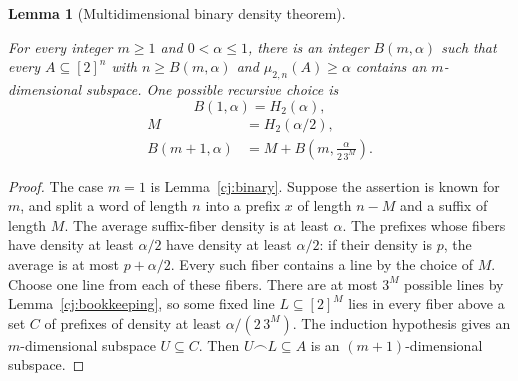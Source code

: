 \documentclass[11pt]{amsart}
\newtheorem{lemma}[theorem]{Lemma}
\theoremstyle{definition}
\theoremstyle{remark}
\numberwithin{equation}{section}
\providecommand{\lean}[1]{}
\providecommand{\leanok}{}
\begin{document}
\begin{lemma}[Multidimensional binary density theorem]\label{cj:binary-multi}
\lean{Auto.C_cj_binary_multi,Auto.cj_binary_multi}
\leanok
For every integer $m\ge1$ and $0<\alpha\le1$, there is an integer
$B(m,\alpha)$ such that every $A\subseteq[2]^n$ with
$n\ge B(m,\alpha)$ and $\mu_{2,n}(A)\ge\alpha$ contains an
$m$-dimensional subspace.  One possible recursive choice is
\[
 B(1,\alpha)=H_2(\alpha),
\]
\[
 \begin{split}
 M&=H_2(\alpha/2),\\
 B(m+1,\alpha)&=M+B\left(m,\frac{\alpha}{2\,3^M}\right).
 \end{split}
\]
\end{lemma}
\begin{proof}
The case $m=1$ is Lemma~\ref{cj:binary}.  Suppose the assertion is
known for $m$, and split a word of length $n$ into a prefix $x$ of
length $n-M$ and a suffix of length $M$.  The average suffix-fiber
density is at least $\alpha$.  The prefixes whose fibers have density
at least $\alpha/2$ have density at least $\alpha/2$: if their density
is $p$, the average is at most $p+\alpha/2$.
Every such fiber contains a line by the choice of $M$.
Choose one line from each of these fibers.  There are at most $3^M$
possible lines by Lemma~\ref{cj:bookkeeping}, so some fixed line
$L\subseteq[2]^M$ lies in every fiber above a set $C$ of prefixes of
density at least $\alpha/(2\,3^M)$.  The induction hypothesis gives
an $m$-dimensional subspace $U\subseteq C$.  Then
$U\frown L\subseteq A$ is an $(m+1)$-dimensional subspace.
\end{proof}
\end{document}
